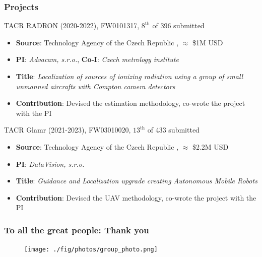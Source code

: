 \documentclass[aspectratio=169]{beamer}
\begin{document}


\begin{frame}
\frametitle{Projects}

\begin{block}{TACR RADRON (2020-2022), FW0101317, $8^{\mathrm{th}}$ of 396 submitted}
  \begin{itemize}
    \item \textbf{Source}: Technology Agency of the Czech Republic , $\approx$ \$1M USD
    \item \textbf{PI}: \emph{Advacam, s.r.o.}, \textbf{Co-I}: \emph{Czech metrology institute}
    \item \textbf{Title}: \emph{Localization of sources of ionizing radiation using a group of small unmanned aircrafts with Compton camera detectors}
    \item \textbf{Contribution}: Devised the estimation methodology, co-wrote the project with the PI
  \end{itemize}
\end{block}

\begin{block}{TACR Glamr (2021-2023), FW03010020, $13^{\mathrm{th}}$ of 433 submitted}
  \begin{itemize}
    \item \textbf{Source}: Technology Agency of the Czech Republic , $\approx$ \$2.2M USD
    \item \textbf{PI}: \emph{DataVision, s.r.o.}
    \item \textbf{Title}: \emph{Guidance and Localization upgrade creating Autonomous Mobile Robots}
    \item \textbf{Contribution}: Devised the UAV methodology, co-wrote the project with the PI
  \end{itemize}
\end{block}

\end{frame}



\begin{frame}
\frametitle{To all the great people: Thank you}

\begin{figure}
    \texttt{[image: ./fig/photos/group\_photo.png]}
\end{figure}

\end{frame}
\end{document}
